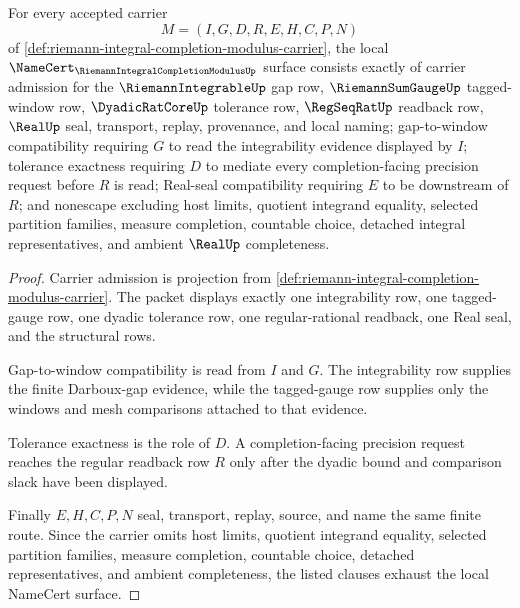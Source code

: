 \begin{theorem}
\label{thm:riemann-integral-completion-modulus-obligations}
For every accepted carrier
$$
M=(I,G,D,R,E,H,C,P,N)
$$
of \autoref{def:riemann-integral-completion-modulus-carrier}, the local $\NameCert_{\RiemannIntegralCompletionModulusUp}$ surface consists exactly of carrier admission for the $\RiemannIntegrableUp$ gap row, $\RiemannSumGaugeUp$ tagged-window row, $\DyadicRatCoreUp$ tolerance row, $\RegSeqRatUp$ readback row, $\RealUp$ seal, transport, replay, provenance, and local naming; gap-to-window compatibility requiring $G$ to read the integrability evidence displayed by $I$; tolerance exactness requiring $D$ to mediate every completion-facing precision request before $R$ is read; Real-seal compatibility requiring $E$ to be downstream of $R$; and nonescape excluding host limits, quotient integrand equality, selected partition families, measure completion, countable choice, detached integral representatives, and ambient $\RealUp$ completeness.
\end{theorem}
\begin{proof}
Carrier admission is projection from \autoref{def:riemann-integral-completion-modulus-carrier}. The packet displays exactly one integrability row, one tagged-gauge row, one dyadic tolerance row, one regular-rational readback, one Real seal, and the structural rows.

Gap-to-window compatibility is read from $I$ and $G$. The integrability row supplies the finite Darboux-gap evidence, while the tagged-gauge row supplies only the windows and mesh comparisons attached to that evidence.

Tolerance exactness is the role of $D$. A completion-facing precision request reaches the regular readback row $R$ only after the dyadic bound and comparison slack have been displayed.

Finally $E,H,C,P,N$ seal, transport, replay, source, and name the same finite route. Since the carrier omits host limits, quotient integrand equality, selected partition families, measure completion, countable choice, detached representatives, and ambient completeness, the listed clauses exhaust the local NameCert surface.
\end{proof}

